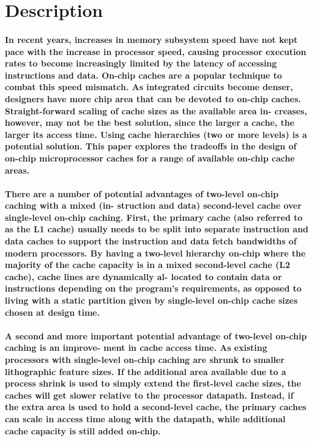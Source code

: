\documentclass{article}
\title{}
\author{}
\date{}
\begin{document}
\maketitle 

\pagebreak

\section{Description}

\paragraph{In recent years, increases in memory subsystem speed have not kept pace with the increase in
processor speed, causing processor execution rates to become increasingly limited by the latency
of accessing instructions and data. On-chip caches are a popular technique to combat this speed
mismatch. As integrated circuits become denser, designers have more chip area that can be
devoted to on-chip caches. Straight-forward scaling of cache sizes as the available area in-
creases, however, may not be the best solution, since the larger a cache, the larger its access
time. Using cache hierarchies (two or more levels) is a potential solution. This paper explores
the tradeoffs in the design of on-chip microprocessor caches for a range of available on-chip
cache areas.}
\paragraph{There are a number of potential advantages of two-level on-chip caching with a mixed (in-
struction and data) second-level cache over single-level on-chip caching. First, the primary
cache (also referred to as the L1 cache) usually needs to be split into separate instruction and
data caches to support the instruction and data fetch bandwidths of modern processors. By having a
 two-level hierarchy on-chip where the majority of the
cache capacity is in a mixed second-level cache (L2 cache), cache lines are dynamically al-
located to contain data or instructions depending on the program’s requirements, as opposed to
living with a static partition given by single-level on-chip cache sizes chosen at design time.}

\paragraph{A second and more important potential advantage of two-level on-chip caching is an improve-
ment in cache access time. As existing processors with single-level on-chip caching are shrunk
to smaller lithographic feature sizes. If the additional area available due to a process shrink is used 
to simply extend the first-level cache sizes, the caches will get
slower relative to the processor datapath. Instead, if the extra area is used to hold a second-level
cache, the primary caches can scale in access time along with the datapath, while additional
cache capacity is still added on-chip.}
\end{document}
